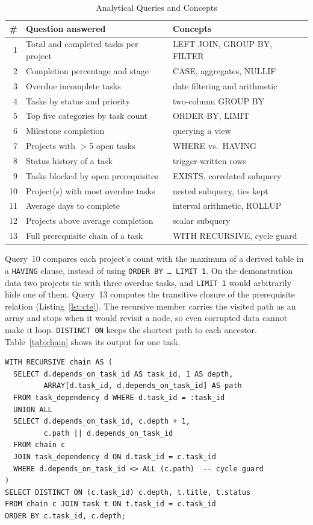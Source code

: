 \documentclass[conference]{IEEEtran}
\begin{document}
\begin{table}[t]
\caption{Analytical Queries and Concepts}
\label{tab:queries}
\centering
\scriptsize
\setlength{\tabcolsep}{3pt}
\begin{tabular}{@{}r p{3.6cm} p{3.2cm}@{}}
\toprule
\textbf{\#} & \textbf{Question answered} & \textbf{Concepts} \\
\midrule
1 & Total and completed tasks per project & LEFT JOIN, GROUP BY, FILTER \\
2 & Completion percentage and stage & CASE, aggregates, NULLIF \\
3 & Overdue incomplete tasks & date filtering and arithmetic \\
4 & Tasks by status and priority & two-column GROUP BY \\
5 & Top five categories by task count & ORDER BY, LIMIT \\
6 & Milestone completion & querying a view \\
7 & Projects with $>$5 open tasks & WHERE vs.\ HAVING \\
8 & Status history of a task & trigger-written rows \\
9 & Tasks blocked by open prerequisites & EXISTS, correlated subquery \\
10 & Project(s) with most overdue tasks & nested subquery, ties kept \\
11 & Average days to complete & interval arithmetic, ROLLUP \\
12 & Projects above average completion & scalar subquery \\
13 & Full prerequisite chain of a task & WITH RECURSIVE, cycle guard \\
\bottomrule
\end{tabular}
\end{table}

Query~10 compares each project's count with the maximum of a derived table in
a \texttt{HAVING} clause, instead of using \texttt{ORDER BY \ldots{} LIMIT 1}.
On the demonstration data two projects tie with three overdue tasks, and
\texttt{LIMIT 1} would arbitrarily hide one of them. Query~13 computes the
transitive closure of the prerequisite relation (Listing~\ref{lst:cte}). The
recursive member carries the visited path as an array and stops when it would
revisit a node, so even corrupted data cannot make it loop.
\texttt{DISTINCT ON} keeps the shortest path to each ancestor.
Table~\ref{tab:chain} shows its output for one task.

\begin{lstlisting}[style=code,float=tb,language=PGSQL,caption={Recursive prerequisite chain (Q13, abridged)},label={lst:cte}]
WITH RECURSIVE chain AS (
  SELECT d.depends_on_task_id AS task_id, 1 AS depth,
         ARRAY[d.task_id, d.depends_on_task_id] AS path
  FROM task_dependency d WHERE d.task_id = :task_id
  UNION ALL
  SELECT d.depends_on_task_id, c.depth + 1,
         c.path || d.depends_on_task_id
  FROM chain c
  JOIN task_dependency d ON d.task_id = c.task_id
  WHERE d.depends_on_task_id <> ALL (c.path)  -- cycle guard
)
SELECT DISTINCT ON (c.task_id) c.depth, t.title, t.status
FROM chain c JOIN task t ON t.task_id = c.task_id
ORDER BY c.task_id, c.depth;
\end{lstlisting}
\end{document}
